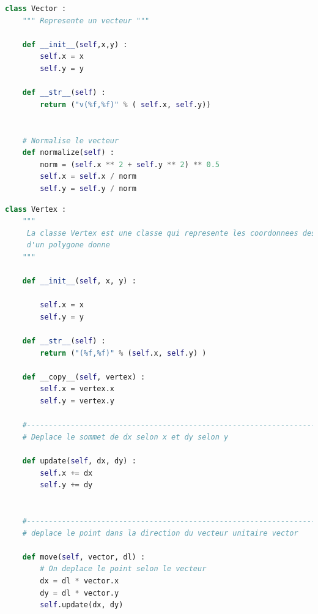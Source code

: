 \documentclass[a4paper,reqno]{article}
\begin{document}

\begin{lstlisting}[language=Python,frame=single,caption=Création de la classe Vecteur]
class Vector : 
    """ Represente un vecteur """
    
    def __init__(self,x,y) : 
        self.x = x 
        self.y = y 
        
    def __str__(self) : 
        return ("v(%f,%f)" % ( self.x, self.y))
        
        
    # Normalise le vecteur 
    def normalize(self) : 
        norm = (self.x ** 2 + self.y ** 2) ** 0.5
        self.x = self.x / norm 
        self.y = self.y / norm 
\end{lstlisting}


\begin{lstlisting}[language=Python,frame=single,caption=Création d'une classe Vertex]
class Vertex : 
    """
     La classe Vertex est une classe qui represente les coordonnees des points 
     d'un polygone donne 
    """
    
    def __init__(self, x, y) : 
        
        self.x = x 
        self.y = y 
    
    def __str__(self) : 
        return ("(%f,%f)" % (self.x, self.y) )
    
    def __copy__(self, vertex) : 
        self.x = vertex.x 
        self.y = vertex.y 
    
    #---------------------------------------------------------------------    
    # Deplace le sommet de dx selon x et dy selon y 
    
    def update(self, dx, dy) : 
        self.x += dx 
        self.y += dy 
        
        
    #---------------------------------------------------------------------   
    # deplace le point dans la direction du vecteur unitaire vector 
    
    def move(self, vector, dl) : 
        # On deplace le point selon le vecteur
        dx = dl * vector.x 
        dy = dl * vector.y 
        self.update(dx, dy) 
\end{lstlisting}


\end{document}
